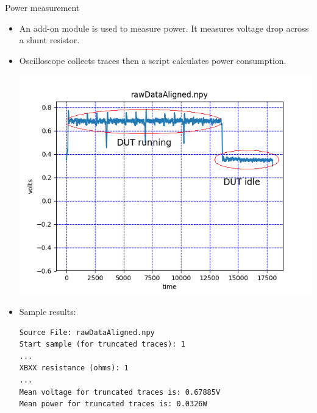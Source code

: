 \documentclass[xcolor=pdftex,dvipsnames,table,final]{beamer}
\begin{document}
\begin{frame}[fragile]{}
\begin{columns}[t]
\begin{column}{.31\linewidth}
      \begin{block}{Power measurement}
         \vspace{-1ex}
         \begin{itemize}
          \item An add-on module is used to measure power. It measures voltage drop across a shunt resistor.
          \item Oscilloscope collects traces then a script calculates power consumption.
        \begin{center}
          \includegraphics[scale=0.8]{images/power.png}
        \end{center}
        \item Sample results:


\begin{Verbatim}[fontsize=\small]
Source File: rawDataAligned.npy
Start sample (for truncated traces): 1
...
XBXX resistance (ohms): 1
...
Mean voltage for truncated traces is: 0.67885V
Mean power for truncated traces is: 0.0326W
\end{Verbatim}
         \end{itemize}



\end{block}
\end{column}
\end{columns}
\end{frame}
\end{document}
